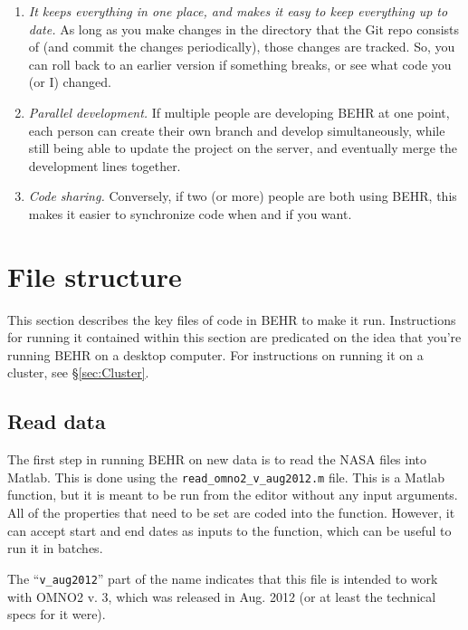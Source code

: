 \documentclass[12pt]{article}
\begin{document}
	\begin{enumerate}
	 \item \emph{It keeps everything in one place, and makes it easy to keep everything up to date.} As long as you make changes in the directory that the Git repo consists of (and commit the changes periodically), those changes are tracked.  So, you can roll back to an earlier version if something breaks, or see what code you (or I) changed.
	 \item \emph{Parallel development.}  If multiple people are developing BEHR at one point, each person can create their own branch and develop simultaneously, while still being able to update the project on the server, and eventually merge the development lines together.
	 \item \emph{Code sharing.} Conversely, if two (or more) people are both using BEHR, this makes it easier to synchronize code when and if you want.
	\end{enumerate}

\section{File structure}
	This section describes the key files of code in BEHR to make it run.  Instructions for running it contained within this section are predicated on the idea that you're running BEHR on a desktop computer.  For instructions on running it on a cluster, see \S\ref{sec:Cluster}.

	\subsection{Read data}
	
	The first step in running BEHR on new data is to read the NASA files into Matlab.  This is done using the \texttt{read\_omno2\_v\_aug2012.m} file.  This is a Matlab function, but it is meant to be run from the editor without any input arguments. All of the properties that need to be set are coded into the function.  However, it can accept start and end dates as inputs to the function, which can be useful to run it in batches.
	
	 The ``\texttt{v\_aug2012}'' part of the name indicates that this file is intended to work with OMNO2 v. 3, which was released in Aug. 2012 (or at least the technical specs for it were).  
	 
\end{document}
